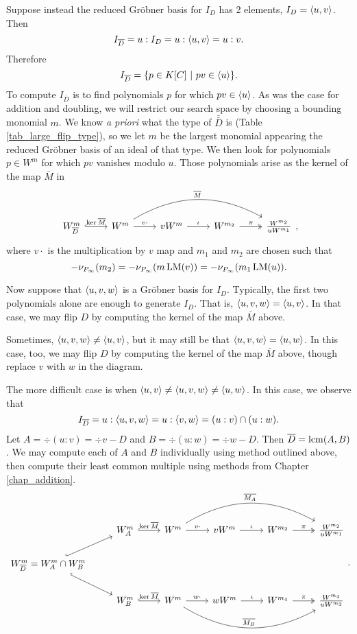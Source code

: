 Suppose instead the reduced Gr\"obner basis for $I_D$ has 2 elements, $I_D = \left\langle u,v \right\rangle$.
Then 
\[ I_{\overline D} = u : I_D = u : \left\langle u,v \right\rangle = u : v. \]
Therefore
\[ I_{\overline D} = \{ p \in K[C] ~|~ pv \in \left\langle u \right\rangle \}. \]
To compute $I_{\bar D}$ is to find polynomials $p$ for which $pv \in \left\langle u \right\rangle$.
As was the case for addition and doubling, we will restrict our search space
by choosing a bounding monomial $m$.
We know \emph{a priori} what the type of $\bar{\bar D}$ is (Table \ref{tab_large_flip_type}),
so we let $m$ be the largest monomial appearing the reduced Gr\"obner basis of an ideal of that type.
We then look for polynomials $p \in W^m$ for which $pv$ vanishes modulo $u$.
Those polynomials arise as the kernel of the map $\bar M$ in 
\[ \begin{tikzcd}
  W_{\bar D}^m \arrow[hook]{r}{\ker\bar M} &
  W^m \arrow{r}{v \cdot} \arrow[bend left]{rrr}{\bar M} &
  vW^m \arrow{r}{\iota} &
  W^{m_2} \arrow[two heads]{r}{\pi} &
  \frac {W^{m_2}} {uW^{m_1}}
\end{tikzcd}, \]
where $v\cdot$ is the multiplication by $v$ map and $m_1$ and $m_2$ are chosen such that
\begin{equation}
  \label{eq_flip_monomial_choice}
  -\nu_{P_\infty}(m_2) = -\nu_{P_\infty}(m\operatorname{LM}(v)) = -\nu_{P_\infty}(m_1\operatorname{LM}(u)).
\end{equation}

Now suppose that $\left\langle u,v,w \right\rangle$ is a Gr\"obner basis for $I_D$.
Typically, the first two polynomials alone are enough to generate $I_D$.
That is, $\left\langle u,v,w \right\rangle = \left\langle u,v \right\rangle$.
In that case, we may flip $D$ by computing the kernel of the map $\bar M$ above.

Sometimes, $\left\langle u,v,w \right\rangle \neq \left\langle u,v \right\rangle$, but it may still be that $\left\langle u,v,w \right\rangle = \left\langle u,w \right\rangle$.
In this case, too, we may flip $D$ by computing the kernel of the map $\bar M$ above,
though replace $v$ with $w$ in the diagram.

The more difficult case is when $\left\langle u,v \right\rangle \neq \left\langle u,v,w \right\rangle \neq \left\langle u,w \right\rangle$.
In this case, we observe that
\[ I_{\overline D} = u : \left\langle u,v,w \right\rangle = u : \left\langle v,w \right\rangle = (u : v) \cap (u : w). \]
Let $A = \div(u : v) = \div v - D$ and $B = \div(u : w) = \div w - D$.
Then $\overline D = \operatorname{lcm}(A,B)$.
We may compute each of $A$ and $B$ individually using method outlined above,
then compute their least common multiple using methods from Chapter \ref{chap_addition}.
\[ \begin{tikzcd}
  & W_A^m \arrow[hook]{r}{\ker\bar M} &
  W^m \arrow{r}{v \cdot} \arrow[bend left]{rrr}{\bar{M_A}} &
  vW^m \arrow{r}{\iota} &
  W^{m_2} \arrow[two heads]{r}{\pi} &
  \frac {W^{m_2}} {uW^{m_1}} \\
  W_{\bar D}^m = W_A^m \cap W_B^m \arrow[hook]{ru} \arrow[hook]{rd} & \\
  & W_B^m \arrow[hook]{r}{\ker\bar M} &
  W^m \arrow{r}{w \cdot} \arrow[bend right]{rrr}{\bar{M_B}} &
  wW^m \arrow{r}{\iota} &
  W^{m_4} \arrow[two heads]{r}{\pi} &
  \frac {W^{m_4}} {uW^{m_3}}
\end{tikzcd}. \]



